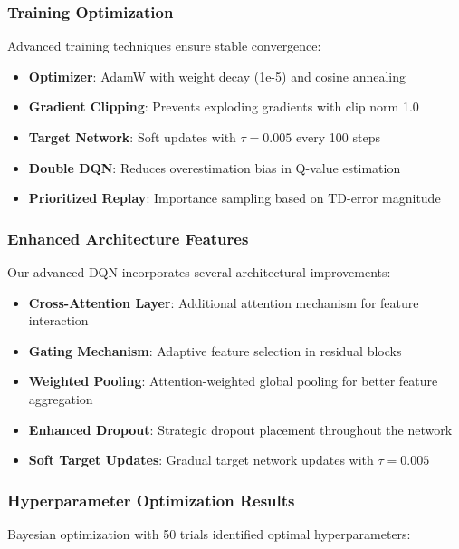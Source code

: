 \documentclass[12pt,a4paper]{article}
\begin{document}
\subsubsection{Training Optimization}
Advanced training techniques ensure stable convergence:

\begin{itemize}
\item \textbf{Optimizer}: AdamW with weight decay (1e-5) and cosine annealing
\item \textbf{Gradient Clipping}: Prevents exploding gradients with clip norm 1.0
\item \textbf{Target Network}: Soft updates with $\tau = 0.005$ every 100 steps
\item \textbf{Double DQN}: Reduces overestimation bias in Q-value estimation
\item \textbf{Prioritized Replay}: Importance sampling based on TD-error magnitude
\end{itemize}

\subsubsection{Enhanced Architecture Features}
Our advanced DQN incorporates several architectural improvements:

\begin{itemize}
\item \textbf{Cross-Attention Layer}: Additional attention mechanism for feature interaction
\item \textbf{Gating Mechanism}: Adaptive feature selection in residual blocks
\item \textbf{Weighted Pooling}: Attention-weighted global pooling for better feature aggregation
\item \textbf{Enhanced Dropout}: Strategic dropout placement throughout the network
\item \textbf{Soft Target Updates}: Gradual target network updates with $\tau = 0.005$
\end{itemize}

\subsubsection{Hyperparameter Optimization Results}
Bayesian optimization with 50 trials identified optimal hyperparameters:
\end{document}
